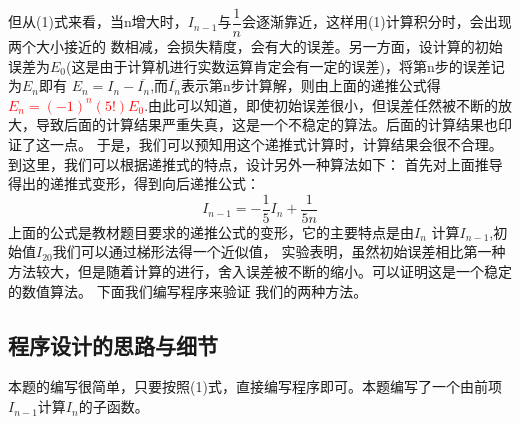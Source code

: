 \documentclass[10pt,a4paper]{ctexart}
\begin{document}
但从(1)式来看，当n增大时，$I_{n-1}$与$\dfrac{1}{n}$会逐渐靠近，这样用(1)计算积分时，会出现两个大小接近的
数相减，会损失精度，会有大的误差。另一方面，设计算的初始误差为$E_0$(这是由于计算机进行实数运算肯定会有一定的误差)，将第n步的误差记为$E_n$即有
$E_n=I_n-\overline{I_n}$,而$\overline{I_n}$表示第n步计算解，则由上面的递推公式得\textcolor{red}{$E_n=(-1)^n(5!)E_0$}.由此可以知道，即使初始误差很小，但误差任然被不断的放大，导致后面的计算结果严重失真，这是一个不稳定的算法。后面的计算结果也印证了这一点。
于是，我们可以预知用这个递推式计算时，计算结果会很不合理。到这里，我们可以根据递推式的特点，设计另外一种算法如下：
首先对上面推导得出的递推式变形，得到向后递推公式：
\[I_{n-1}=-\dfrac{1}{5}I_n+\dfrac{1}{5n}\]
上面的公式是教材题目要求的递推公式的变形，它的主要特点是由$I_n$
计算$I_{n-1}$,初始值$I_{20}$我们可以通过梯形法得一个近似值，
实验表明，虽然初始误差相比第一种方法较大，但是随着计算的进行，舍入误差被不断的缩小。可以证明这是一个稳定的数值算法。
下面我们编写程序来验证
我们的两种方法。
\subsection{程序设计的思路与细节}
本题的编写很简单，只要按照(1)式，直接编写程序即可。本题编写了一个由前项$I_{n-1}$计算$I_n$的子函数。
\end{document}
